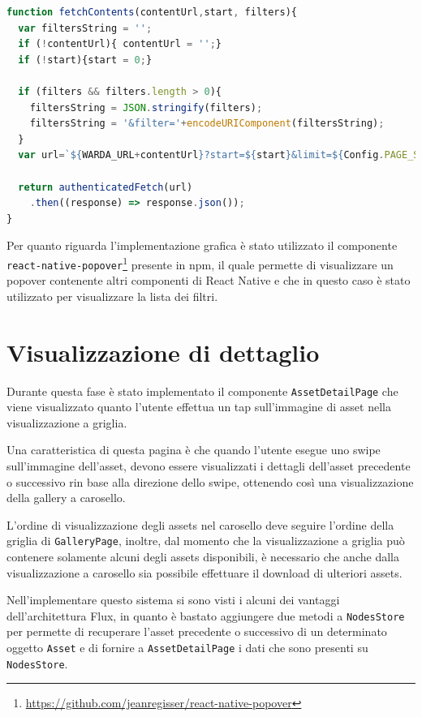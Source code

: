 \begin{lstlisting}[language=JavaScript, caption=WardaFetcher - Caricamento degli assets considerando i filtri]
function fetchContents(contentUrl,start, filters){
  var filtersString = '';
  if (!contentUrl){ contentUrl = '';}
  if (!start){start = 0;}

  if (filters && filters.length > 0){
    filtersString = JSON.stringify(filters);
    filtersString = '&filter='+encodeURIComponent(filtersString);
  }
  var url=`${WARDA_URL+contentUrl}?start=${start}&limit=${Config.PAGE_SIZE}${filtersString}`;

  return authenticatedFetch(url)
    .then((response) => response.json());
}
\end{lstlisting}

Per quanto riguarda l'implementazione grafica è stato utilizzato il componente \texttt{react-native-popover}\footnote{\url{https://github.com/jeanregisser/react-native-popover}} presente in npm, il quale permette di visualizzare un popover contenente altri componenti di React Native e che in questo caso è stato utilizzato per visualizzare la lista dei filtri.

\section{Visualizzazione di dettaglio}

Durante questa fase è stato implementato il componente \texttt{AssetDetailPage} che viene visualizzato quanto l'utente effettua un tap sull'immagine di asset nella visualizzazione a griglia. 

Una caratteristica di questa pagina è che quando l'utente esegue uno swipe sull'immagine dell'asset, devono essere visualizzati i dettagli dell'asset precedente o successivo rin base alla direzione dello swipe, ottenendo così una visualizzazione della gallery a carosello.

L'ordine di visualizzazione degli assets nel carosello deve seguire l'ordine della griglia di \texttt{GalleryPage}, inoltre, dal momento che la visualizzazione a griglia può contenere solamente alcuni degli assets disponibili, è necessario che anche dalla visualizzazione a carosello sia possibile effettuare il download di ulteriori assets.

Nell'implementare questo sistema si sono visti i alcuni dei vantaggi dell'architettura Flux, in quanto è bastato aggiungere due metodi a \texttt{NodesStore} per permette di recuperare l'asset precedente o successivo di un determinato oggetto \texttt{Asset} e di fornire a \texttt{AssetDetailPage} i dati che sono presenti su \texttt{NodesStore}.

